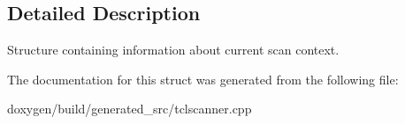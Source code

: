 \subsection{Detailed Description}
Structure containing information about current scan context. 

The documentation for this struct was generated from the following file\+:\begin{DoxyCompactItemize}
\item 
doxygen/build/generated\+\_\+src/tclscanner.\+cpp\end{DoxyCompactItemize}
